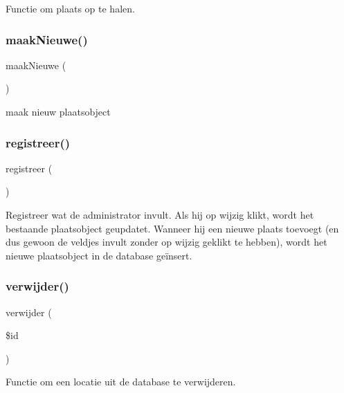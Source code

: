 Functie om plaats op te halen. 

\mbox{\label{class_plaats_a7e7e04e0718668180cf4e8fb0b4dea9b}} 
\subsubsection{\texorpdfstring{maak\+Nieuwe()}{maakNieuwe()}}
{\footnotesize\ttfamily maak\+Nieuwe (\begin{DoxyParamCaption}{ }\end{DoxyParamCaption})}



maak nieuw plaatsobject 

\mbox{\label{class_plaats_a6db5689af94fb09c1652e5f3b1d2770a}} 
\subsubsection{\texorpdfstring{registreer()}{registreer()}}
{\footnotesize\ttfamily registreer (\begin{DoxyParamCaption}{ }\end{DoxyParamCaption})}



Registreer wat de administrator invult. Als hij op wijzig klikt, wordt het bestaande plaatsobject geupdatet. Wanneer hij een nieuwe plaats toevoegt (en dus gewoon de veldjes invult zonder op wijzig geklikt te hebben), wordt het nieuwe plaatsobject in de database geïnsert. 

\mbox{\label{class_plaats_aa5997c2d1474e374ea50a87e8673d2e4}} 
\subsubsection{\texorpdfstring{verwijder()}{verwijder()}}
{\footnotesize\ttfamily verwijder (\begin{DoxyParamCaption}\item[{}]{\$id }\end{DoxyParamCaption})}



Functie om een locatie uit de database te verwijderen. 


